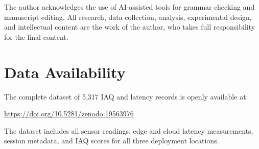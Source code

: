 \documentclass[12pt, a4paper]{article}
\begin{document}
The author acknowledges the use of AI-assisted tools for grammar
checking and manuscript editing. All research, data collection,
analysis, experimental design, and intellectual content are the work
of the author, who takes full responsibility for the final content.

\section*{Data Availability}

The complete dataset of 5{,}317 IAQ and latency records is openly
available at:
\begin{center}
\url{https://doi.org/10.5281/zenodo.19563976}
\end{center}
The dataset includes all sensor readings, edge and cloud latency
measurements, session metadata, and IAQ scores for all three
deployment locations.
\end{document}
